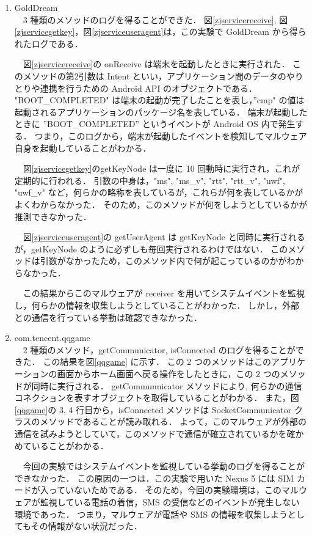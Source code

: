\begin{enumerate}
\item GoldDream \mbox{}\\
	\ \ 3 種類のメソッドのログを得ることができた．
	図\ref{zjservicereceive}, 図\ref{zjservicegetkey}，図\ref{zjserviceuseragent}は，この実験で GoldDream から得られたログである．
	
	\ \ 図\ref{zjservicereceive}の onReceive は端末を起動したときに実行された．
	このメソッドの第2引数は Intent といい，アプリケーション間のデータのやりとりや連携を行うための Android API のオブジェクトである．
	"BOOT\_COMPLETED" は端末の起動が完了したことを表し，”cmp" の値は起動されるアプリケーションのパッケージ名を表している．
	端末が起動したときに ”BOOT\_COMPLETED” というイベントが Android OS 内で発生する．
	つまり，このログから，端末が起動したイベントを検知してマルウェア自身を起動していることがわかる．
	
	\ \ 図\ref{zjservicegetkey}のgetKeyNode は一度に 10 回動時に実行され，これが定期的に行われる．
	引数の中身は，"ms", "ms\_v", "rtt", "rtt\_v", "uwf", "uwf\_v" など，何らかの略称を表しているが，これらが何を表しているかがよくわからなかった．
	そのため，このメソッドが何をしようとしているかが推測できなかった．
	
	\ \ 図\ref{zjserviceuseragent}の getUserAgent は getKeyNode と同時に実行されるが，getKeyNode のように必ずしも毎回実行されるわけではない．
	このメソッドは引数がなかったため，このメソッド内で何が起こっているのかがわからなかった．
	
	\ \ この結果からこのマルウェアが receiver を用いてシステムイベントを監視し，何らかの情報を収集しようとしていることがわかった．
	しかし，外部との通信を行っている挙動は確認できなかった．
	
\item com.tencent.qqgame \mbox{}\\
	\ \ 2 種類のメソッド，getCommunicator, isConnected のログを得ることができた．
	この結果を図\ref{qqgame} に示す．
	この 2 つのメソッドはこのアプリケーションの画面からホーム画面へ戻る操作をしたときに，この 2 つのメソッドが同時に実行される．
	getCommunnicator メソッドにより, 何らかの通信コネクションを表すオブジェクトを取得していることがわかる．
	また，図\ref{qqgame}の 3, 4 行目から，isConnected メソッドは SocketCommunicator クラスのメソッドであることが読み取れる．
	よって，このマルウェアが外部の通信を試みようとしていて，このメソッドで通信が確立されているかを確かめていることがわかる．
	
	\ \ 今回の実験ではシステムイベントを監視している挙動のログを得ることができなかった．
	この原因の一つは．この実験で用いた Nexus 5 には SIM カードが入っていないためである．
	そのため，今回の実験環境は，このマルウェアが監視している電話の着信，SMS の受信などのイベントが発生しない環境であった．
	つまり，マルウェアが電話や SMS の情報を収集しようとしてもその情報がない状況だった．
	

\end{enumerate}
